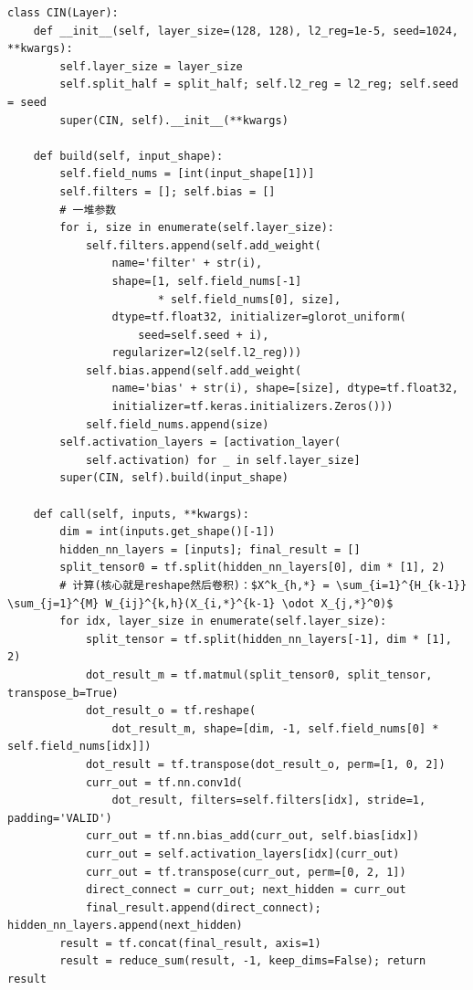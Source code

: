 \documentclass[degree=project,degree-type=project,cjk-font=noto]{thuthesis}
\begin{document}
  \begin{verbatim}
class CIN(Layer):
    def __init__(self, layer_size=(128, 128), l2_reg=1e-5, seed=1024, **kwargs):
        self.layer_size = layer_size
        self.split_half = split_half; self.l2_reg = l2_reg; self.seed = seed
        super(CIN, self).__init__(**kwargs)

    def build(self, input_shape):
        self.field_nums = [int(input_shape[1])]
        self.filters = []; self.bias = []
        # 一堆参数
        for i, size in enumerate(self.layer_size):
            self.filters.append(self.add_weight(
                name='filter' + str(i),
                shape=[1, self.field_nums[-1]
                       * self.field_nums[0], size],
                dtype=tf.float32, initializer=glorot_uniform(
                    seed=self.seed + i),
                regularizer=l2(self.l2_reg)))
            self.bias.append(self.add_weight(
                name='bias' + str(i), shape=[size], dtype=tf.float32,
                initializer=tf.keras.initializers.Zeros()))
            self.field_nums.append(size)
        self.activation_layers = [activation_layer(
            self.activation) for _ in self.layer_size]
        super(CIN, self).build(input_shape)

    def call(self, inputs, **kwargs):
        dim = int(inputs.get_shape()[-1])
        hidden_nn_layers = [inputs]; final_result = []
        split_tensor0 = tf.split(hidden_nn_layers[0], dim * [1], 2)
        # 计算(核心就是reshape然后卷积)：$X^k_{h,*} = \sum_{i=1}^{H_{k-1}} \sum_{j=1}^{M} W_{ij}^{k,h}(X_{i,*}^{k-1} \odot X_{j,*}^0)$
        for idx, layer_size in enumerate(self.layer_size):
            split_tensor = tf.split(hidden_nn_layers[-1], dim * [1], 2)
            dot_result_m = tf.matmul(split_tensor0, split_tensor, transpose_b=True)
            dot_result_o = tf.reshape(
                dot_result_m, shape=[dim, -1, self.field_nums[0] * self.field_nums[idx]])
            dot_result = tf.transpose(dot_result_o, perm=[1, 0, 2])
            curr_out = tf.nn.conv1d(
                dot_result, filters=self.filters[idx], stride=1, padding='VALID')
            curr_out = tf.nn.bias_add(curr_out, self.bias[idx])
            curr_out = self.activation_layers[idx](curr_out)
            curr_out = tf.transpose(curr_out, perm=[0, 2, 1])
            direct_connect = curr_out; next_hidden = curr_out
            final_result.append(direct_connect); hidden_nn_layers.append(next_hidden)
        result = tf.concat(final_result, axis=1)
        result = reduce_sum(result, -1, keep_dims=False); return result
  \end{verbatim}
\end{document}
